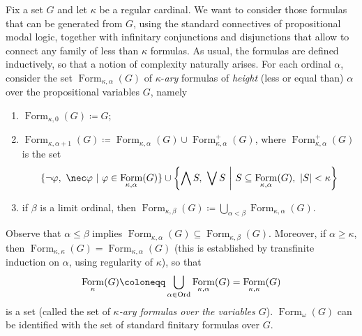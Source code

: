 \documentclass{article}
\theoremstyle{definition}
\DeclareMathOperator{\Formulas}{Form}
\newcommand{\Ord}{\textup{Ord}}
\newcommand{\Prop}{\textup{Prop}}
\begin{document}
Fix a set $G$ and let $\kappa$ be a regular cardinal. We want to consider those formulas that can be generated from $G$, using the standard connectives of propositional modal logic, together with infinitary conjunctions and disjunctions that allow to connect any family of less than $\kappa$ formulas. As usual, the formulas are defined inductively, so that a notion of complexity naturally arises. For each ordinal $\alpha$, consider the set $\Formulas_{\kappa,\alpha}(G)$ of $\kappa$-\emph{ary} formulas of \emph{height} (less or equal than) $\alpha$ over the propositional variables $G$, namely
\begin{enumerate}
    \item $\Formulas_{\kappa,0}(G) \coloneqq G$;
    \item $\Formulas_{\kappa,\alpha + 1}(G) \coloneqq \Formulas_{\kappa,\alpha}(G) \cup \Formulas_{\kappa,\alpha}^+(G)$, where $\Formulas_{\kappa,\alpha}^+(G)$ is the set
    $$\{\neg \varphi,\ \nec \varphi\ \vert\ \varphi \in \Formulas_{\kappa,\alpha}(G)\} \cup \left\{\bigwedge S,\ \bigvee S\ \middle\vert\ S \subseteq \Formulas_{\kappa,\alpha}(G),\ |S| < \kappa \right\}$$
    \item if $\beta$ is a limit ordinal, then $\Formulas_{\kappa,\beta}(G) \coloneqq \bigcup_{\alpha < \beta} \Formulas_{\kappa,\alpha}(G)$.
\end{enumerate}

Observe that $\alpha \leq \beta$ implies $\Formulas_{\kappa,\alpha}(G) \subseteq \Formulas_{\kappa,\beta}(G)$. Moreover, if $\alpha \geq \kappa$, then $\Formulas_{\kappa,\kappa}(G) = \Formulas_{\kappa,\alpha}(G)$ (this is established by transfinite induction on $\alpha$, using regularity of $\kappa$), so that
$$\Formulas_\kappa(G) \coloneqq \bigcup_{\alpha \in \Ord} \Formulas_{\kappa,\alpha}(G) = \Formulas_{\kappa,\kappa}(G)$$
is a set (called the set of \emph{$\kappa$-ary formulas over the variables $G$}). $\Formulas_\omega(G)$ can be identified with the set of standard finitary formulas over $G$.

\end{document}
